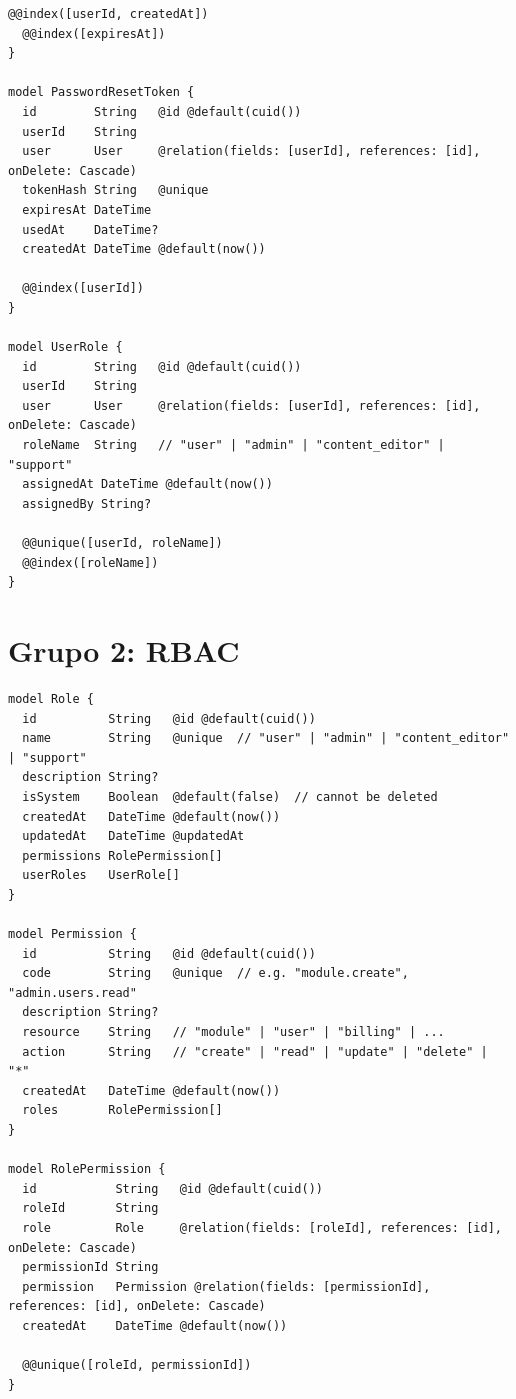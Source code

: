 \begin{lstlisting}[style=sql,caption={Modelos de autenticación y usuarios}]
  @@index([userId, createdAt])
  @@index([expiresAt])
}

model PasswordResetToken {
  id        String   @id @default(cuid())
  userId    String
  user      User     @relation(fields: [userId], references: [id], onDelete: Cascade)
  tokenHash String   @unique
  expiresAt DateTime
  usedAt    DateTime?
  createdAt DateTime @default(now())

  @@index([userId])
}

model UserRole {
  id        String   @id @default(cuid())
  userId    String
  user      User     @relation(fields: [userId], references: [id], onDelete: Cascade)
  roleName  String   // "user" | "admin" | "content_editor" | "support"
  assignedAt DateTime @default(now())
  assignedBy String?

  @@unique([userId, roleName])
  @@index([roleName])
}
\end{lstlisting}

\section{Grupo 2: RBAC}

\begin{lstlisting}[style=sql,caption={Modelos de control de acceso (RBAC)}]
model Role {
  id          String   @id @default(cuid())
  name        String   @unique  // "user" | "admin" | "content_editor" | "support"
  description String?
  isSystem    Boolean  @default(false)  // cannot be deleted
  createdAt   DateTime @default(now())
  updatedAt   DateTime @updatedAt
  permissions RolePermission[]
  userRoles   UserRole[]
}

model Permission {
  id          String   @id @default(cuid())
  code        String   @unique  // e.g. "module.create", "admin.users.read"
  description String?
  resource    String   // "module" | "user" | "billing" | ...
  action      String   // "create" | "read" | "update" | "delete" | "*"
  createdAt   DateTime @default(now())
  roles       RolePermission[]
}

model RolePermission {
  id           String   @id @default(cuid())
  roleId       String
  role         Role     @relation(fields: [roleId], references: [id], onDelete: Cascade)
  permissionId String
  permission   Permission @relation(fields: [permissionId], references: [id], onDelete: Cascade)
  createdAt    DateTime @default(now())

  @@unique([roleId, permissionId])
}
\end{lstlisting}

